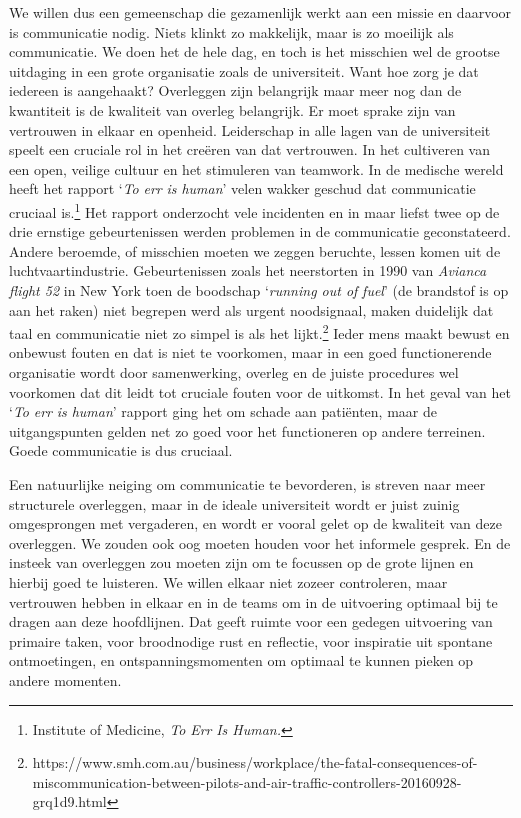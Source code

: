 \documentclass[smallauthor, chapterhaspagenum, nochapterinheader, pagenuminheader,  bigchapnum,medium2, tocpages, garamond, titleinheader]{jote-book}
\begin{document}
	We willen dus een gemeenschap die gezamenlijk werkt aan een missie en daarvoor is communicatie nodig. Niets klinkt zo makkelijk, maar is zo moeilijk als communicatie. We doen het de hele dag, en toch is het misschien wel de grootse uitdaging in een grote organisatie zoals de universiteit. Want hoe zorg je dat iedereen is aangehaakt? Overleggen zijn belangrijk maar meer nog dan de kwantiteit is de kwaliteit van overleg belangrijk. Er moet sprake zijn van vertrouwen in elkaar en openheid. Leiderschap in alle lagen van de universiteit speelt een cruciale rol in het creëren van dat vertrouwen. In het cultiveren van een open, veilige cultuur en het stimuleren van teamwork. In de medische wereld heeft het rapport ‘\emph{To}\emph{ }\emph{err}\emph{ is human}' velen wakker geschud dat communicatie cruciaal is.\footnote{Institute of Medicine, \emph{To}\emph{ }\emph{Err}\emph{ Is Hum}\emph{an.}} Het rapport onderzocht vele incidenten en in maar liefst twee op de drie ernstige gebeurtenissen werden problemen in de communicatie geconstateerd. Andere beroemde, of misschien moeten we zeggen beruchte, lessen komen uit de luchtvaartindustrie. Gebeurtenissen zoals het neerstorten in 1990 van \emph{Avianca}\emph{ flight 52} in New York toen de boodschap ‘\emph{running out of }\emph{fuel}' (de brandstof is op aan het raken) niet begrepen werd als urgent noodsignaal, maken duidelijk dat taal en communicatie niet zo simpel is als het lijkt.\footnote{https://www.smh.com.au/business/workplace/the-fatal-consequences-of-miscommunication-between-pilots-and-air-traffic-controllers-20160928-grq1d9.html} Ieder mens maakt bewust en onbewust fouten en dat is niet te voorkomen, maar in een goed functionerende organisatie wordt door samenwerking, overleg en de juiste procedures wel voorkomen dat dit leidt tot cruciale fouten voor de uitkomst. In het geval van het ‘\emph{To}\emph{ }\emph{err}\emph{ is human}' rapport ging het om schade aan patiënten, maar de uitgangspunten gelden net zo goed voor het functioneren op andere terreinen. Goede communicatie is dus cruciaal.



	Een natuurlijke neiging om communicatie te bevorderen, is streven naar meer structurele overleggen, maar in de ideale universiteit wordt er juist zuinig omgesprongen met vergaderen, en wordt er vooral gelet op de kwaliteit van deze overleggen. We zouden ook oog moeten houden voor het informele gesprek. En de insteek van overleggen zou moeten zijn om te focussen op de grote lijnen en hierbij goed te luisteren. We willen elkaar niet zozeer controleren, maar vertrouwen hebben in elkaar en in de teams om in de uitvoering optimaal bij te dragen aan deze hoofdlijnen. Dat geeft ruimte voor een gedegen uitvoering van primaire taken, voor broodnodige rust en reflectie, voor inspiratie uit spontane ontmoetingen, en ontspanningsmomenten om optimaal te kunnen pieken op andere momenten.
\end{document}
